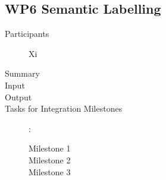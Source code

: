 \documentclass[11pt,a4paper]{article}
\begin{document}
\subsection{WP6 Semantic Labelling} %

\begin{description}
\item[Participants] Xi
\item[Summary]
\item[Input]
\item[Output]
\item[Tasks for Integration Milestones]:\
	\begin{description}
		\item[Milestone 1]
		\item[Milestone 2]
		\item[Milestone 3] 
	\end{description}	 
\end{description}
\end{document}

